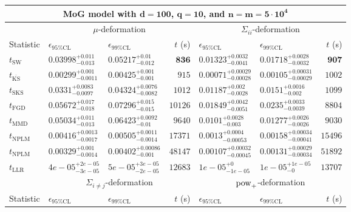 \begin{tabular}{l|llr|llr}
	\toprule
	\multicolumn{7}{c}{{\bf MoG model with $\mathbf{d=100}$, $\mathbf{q=10}$, and $\mathbf{n=m=5\cdot 10^{4}}$}} \\
	\toprule
	\multicolumn{1}{c}{} & \multicolumn{3}{c}{$\mu$-deformation} & \multicolumn{3}{c}{$\Sigma_{ii}$-deformation} \\
	Statistic & $\epsilon_{95\%\mathrm{CL}}$ & $\epsilon_{99\%\mathrm{CL}}$ & $t$ (s) & $\epsilon_{95\%\mathrm{CL}}$ & $\epsilon_{99\%\mathrm{CL}}$ & $t$ (s) \\
	\midrule
	$t_{\mathrm{SW}}$ & $0.03998_{-0.013}^{+0.011}$ & $0.05217_{-0.012}^{+0.01}$ & ${\mathbf{836}}$ & $0.01323_{-0.0041}^{+0.0032}$ & $0.01718_{-0.0032}^{+0.0028}$ & ${\mathbf{907}}$ \\
	$t_{\overline{\mathrm{KS}}}$ & ${\mathbf{0.00299_{-0.0011}^{+0.001}}}$ & ${\mathbf{0.00425_{-0.001}^{+0.001}}}$ & $915$ & ${\mathbf{0.00071_{-0.00028}^{+0.00029}}}$ & ${\mathbf{0.00105_{-0.00029}^{+0.00031}}}$ & $1002$ \\
	$t_{\mathrm{SKS}}$ & $0.0331_{-0.0097}^{+0.0083}$ & $0.04324_{-0.0082}^{+0.0076}$ & $1012$ & $0.01187_{-0.0028}^{+0.002}$ & $0.0151_{-0.002}^{+0.0016}$ & $1099$ \\
	$t_{\mathrm{FGD}}$ & $0.05672_{-0.018}^{+0.017}$ & $0.07296_{-0.015}^{+0.015}$ & $10126$ & $0.01849_{-0.0051}^{+0.0042}$ & $0.0235_{-0.0039}^{+0.0033}$ & $8804$ \\
	$t_{\mathrm{MMD}}$ & $0.05034_{-0.013}^{+0.011}$ & $0.06423_{-0.01}^{+0.0092}$ & $9640$ & $0.0101_{-0.003}^{+0.0028}$ & $0.01277_{-0.0026}^{+0.0026}$ & $9030$ \\
\rowcolor{red!35}	$t_{\mathrm{NPLM}}$ & $0.00416_{-0.0017}^{+0.0013}$ & $0.00505_{-0.0014}^{+0.0011}$ & $17371$ & $0.0013_{-0.00053}^{+0.0004}$ & $0.00158_{-0.00041}^{+0.00034}$ & $15496$ \\
\rowcolor{blue!35}	$t_{\mathrm{NPLM}}$ & $0.00329_{-0.0014}^{+0.001}$ & $0.00402_{-0.001}^{+0.00086}$ & $48147$ & $0.00107_{-0.00045}^{+0.00032}$ & $0.00131_{-0.00034}^{+0.00029}$ & $51892$ \\
	$t_{\mathrm{LLR}}$ & $4e-05_{-3e-05}^{+2e-05}$ & $5e-05_{-2e-05}^{+3e-05}$ & $12683$ & $1e-05_{-1e-05}^{+0}$ & $1e-05_{-0}^{+1e-05}$ & $13707$ \\
	\toprule
	\multicolumn{1}{c}{} & \multicolumn{3}{c}{$\Sigma_{i\neq j}$-deformation} & \multicolumn{3}{c}{$\rm{pow}_{+}$-deformation} \\
	Statistic & $\epsilon_{95\%\mathrm{CL}}$ & $\epsilon_{99\%\mathrm{CL}}$ & $t$ (s) & $\epsilon_{95\%\mathrm{CL}}$ & $\epsilon_{99\%\mathrm{CL}}$ & $t$ (s) \\

\end{tabular}
